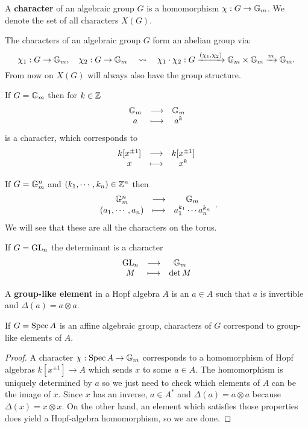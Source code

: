 \begin{definition}[Character]
A \textbf{character} of an algebraic group $G$ is a homomorphism $\chi:G\to \mathbb{G}_m$. We denote the set of all characters $X(G)$.
\end{definition}
\begin{remark}
The characters of an algebraic group $G$ form an abelian group via:
\[\chi_1:G\to \mathbb{G}_m,\quad \chi_2:G\to \mathbb{G}_m\quad\leadsto\quad \chi_1\cdot\chi_2:G\xrightarrow{(\chi_1,\chi_2)}\mathbb{G}_m\times\mathbb{G}_m\xrightarrow{m}\mathbb{G}_m.\]
From now on $X(G)$ will always also have the group structure.
\end{remark}

\begin{example}
If $G=\mathbb{G}_m$ then for $k\in \mathbb{Z}$
\[\begin{array}{ccc} {\mathbb{G}_m} & \longrightarrow & {\mathbb{G}_m}\\ {a} & \longmapsto & {a^k} \end{array}\]
is a character, which corresponds to
\[\begin{array}{ccc} {k[x^{\pm1}]} & \longrightarrow & {k[x^{\pm1}]}\\ {x} & \longmapsto & {x^k} \end{array}\]
\end{example}

\begin{example}
If $G=\mathbb{G}_m^n$ and $(k_1,\cdots, k_n)\in\mathbb{Z}^n$ then
\[\begin{array}{ccc} {\mathbb{G}_m^n} & \longrightarrow & {\mathbb{G}_m}\\ {(a_1,\cdots,a_n)} & \longmapsto & {a_1^{k_1}\cdots a_n^{k_n}} \end{array}.\]
We will see that these are all the characters on the torus.
\end{example}

\begin{example}
If $G=\mathrm{GL}_n$ the determinant is a character
\[\begin{array}{ccc} {\mathrm{GL}_n} & \longrightarrow & {\mathbb{G}_m}\\ {M} & \longmapsto & {\det M} \end{array}\]
\end{example}


\begin{definition}
A \textbf{group-like element} in a Hopf algebra $A$ is an $a\in A$ such that $a$ is invertible and $\Delta(a)=a\otimes a$.
\end{definition}

\begin{lemma}\label{LmCharactersAreGroupLikeElements}
If $G=\operatorname{Spec} A$ is an affine algebraic group, characters of $G$ correspond to {group-like} elements of $A$.
\end{lemma}
\begin{proof}
A character $\chi:\operatorname{Spec} A\to \mathbb{G}_m$ corresponds to a homomorphism of Hopf algebras $k[x^{\pm1}]\to A$ which sends $x$ to some $a\in A$. The homomorphism is uniquely determined by $a$ so we just need to check which elements of $A$ can be the image of $x$. Since $x$ has an inverse, $a\in A^\ast$ and $\Delta(a)=a\otimes a$ because $\Delta(x)=x\otimes x$. On the other hand, an element which satisfies those properties does yield a Hopf-algebra homomorphism, so we are done.
\end{proof}

